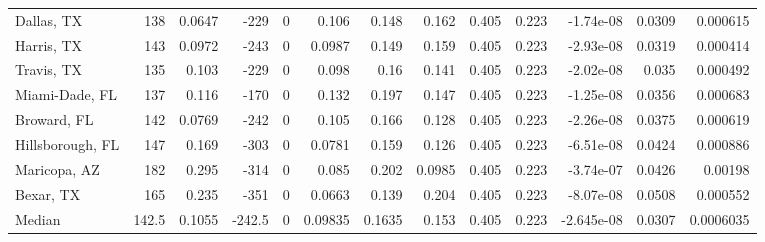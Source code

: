 \documentclass[12pt,letterpaper]{article}
\begin{document}
\begin{sidewaystable}
{\begin{tabular}{lrrrrrrrrrrrr}
 Dallas, TX        & 138   &  0.0647 & -229   &     0 &         0.106   &           0.148  &         0.162  &        0.405 &        0.223 &       -1.74e-08  &           0.0309  &       0.000615  \\
 Harris, TX        & 143   &  0.0972 & -243   &     0 &         0.0987  &           0.149  &         0.159  &        0.405 &        0.223 &       -2.93e-08  &           0.0319  &       0.000414  \\
 Travis, TX        & 135   &  0.103  & -229   &     0 &         0.098   &           0.16   &         0.141  &        0.405 &        0.223 &       -2.02e-08  &           0.035   &       0.000492  \\
 Miami-Dade, FL    & 137   &  0.116  & -170   &     0 &         0.132   &           0.197  &         0.147  &        0.405 &        0.223 &       -1.25e-08  &           0.0356  &       0.000683  \\
 Broward, FL       & 142   &  0.0769 & -242   &     0 &         0.105   &           0.166  &         0.128  &        0.405 &        0.223 &       -2.26e-08  &           0.0375  &       0.000619  \\
 Hillsborough, FL  & 147   &  0.169  & -303   &     0 &         0.0781  &           0.159  &         0.126  &        0.405 &        0.223 &       -6.51e-08  &           0.0424  &       0.000886  \\
 Maricopa, AZ      & 182   &  0.295  & -314   &     0 &         0.085   &           0.202  &         0.0985 &        0.405 &        0.223 &       -3.74e-07  &           0.0426  &       0.00198   \\
 Bexar, TX         & 165   &  0.235  & -351   &     0 &         0.0663  &           0.139  &         0.204  &        0.405 &        0.223 &       -8.07e-08  &           0.0508  &       0.000552  \\
\hline
 Median            & 142.5 &  0.1055 & -242.5 &     0 &         0.09835 &           0.1635 &         0.153  &        0.405 &        0.223 &       -2.645e-08 &           0.0307  &       0.0006035 \\
\hline
\end{tabular}


}\end{sidewaystable}
\end{document}
